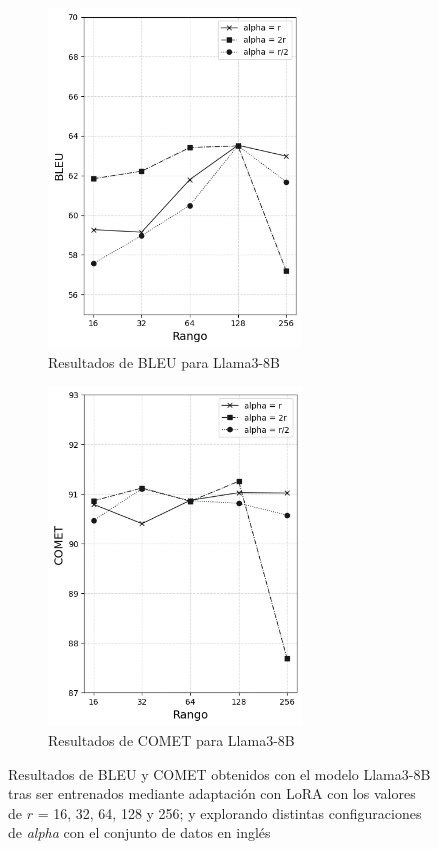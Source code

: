 \documentclass[11pt,spanish,listoffigures,listoftables]{tfgetsinf}
\begin{document}
\begin{figure}
\begin{subfigure}{0.5\textwidth}
\includegraphics[width=0.9\linewidth, height=9cm]{images/llama_BLEU_en_} 
\caption{Resultados de BLEU para Llama3-8B}
\label{fig:subim1}
\end{subfigure}
\begin{subfigure}{0.5\textwidth}
\includegraphics[width=0.9\linewidth, height=9cm]{images/llama_COMET_en_}
\caption{Resultados de COMET para Llama3-8B}
\label{fig:subim2}
\end{subfigure}

\caption{Resultados de BLEU y COMET obtenidos con el modelo Llama3-8B tras ser entrenados mediante adaptación con LoRA con los valores de $r$ = 16, 32, 64, 128 y 256;  y explorando distintas configuraciones de \textit{alpha} con el conjunto de datos en inglés}
\label{fig:graficasLlama inglés}
\end{figure}
\end{document}
